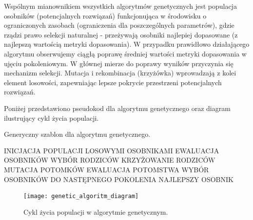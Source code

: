 \documentclass[a4paper,11pt]{article}
\begin{document}
    \bigskip

    Wspólnym mianownikiem wszystkich algorytmów genetycznych jest populacja osobników (potencjalnych rozwiązań) funkcjonująca w środowisku o ograniczonych zasobach (ograniczenia dla poszczególnych parametrów), gdzie rządzi prawo selekcji naturalnej - przeżywają osobniki najlepiej dopasowane (z najlepszą wartością metryki dopasowania)\cite{IntroductionToEvolutionaryComputing2015}. W przypadku prawidłowo działającego algorytmu obserwujemy ciągłą poprawę średniej wartości metryki dopasowania w ujęciu pokoleniowym. W głównej mierze do poprawy wyników przyczynia się mechanizm selekcji. Mutacja i rekombinacja (krzyżówka) wprowadzają z kolei element losowości, zapewniając lepsze pokrycie przestrzeni potencjalnych rozwiązań.

    \bigskip

    \noindent
    \begin{minipage}[H]{\textwidth}
        \setlength\parindent{17pt} Poniżej przedstawiono pseudokod dla algorytmu genetycznego oraz diagram ilustrujący cykl życia populacji. \\
        \begin{algorithm}[H]
            \caption{Generyczny szablon dla algorytmu genetycznego\cite{IntroductionToEvolutionaryComputing2015}.}
            \label{alg:genetic_algorithm_template}
            \begin{algorithmic}
                \State INICJACJA POPULACJI LOSOWYMI OSOBNIKAMI
                \State EWALUACJA OSOBNIKÓW
                    \State WYBÓR RODZICÓW
                    \State KRZYŻOWANIE RODZICÓW
                    \State MUTACJA POTOMKÓW
                    \State EWALUACJA POTOMSTWA
                    \State WYBÓR OSOBNIKÓW DO NASTĘPNEGO POKOLENIA
                \EndWhile
                \State \Return NAJLEPSZY OSOBNIK
            \end{algorithmic}
        \end{algorithm}
    \end{minipage}

    \bigskip

    \begin{figure}[H]
        \label{fig:genetic_algoritm_diagram}
        \centering
        \texttt{[image: genetic\_algoritm\_diagram]}
        \caption{Cykl życia populacji w algorytmie genetycznym\cite{IntroductionToEvolutionaryComputing2015}.}
    \end{figure}
\end{document}
